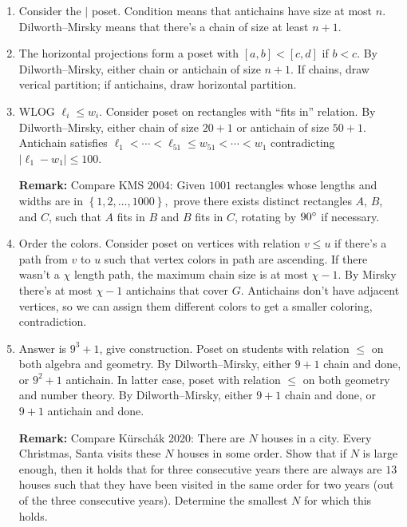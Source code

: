\documentclass[11pt,paper=letter]{scrartcl}
\begin{document}
\begin{enumerate}
\item Consider the $\mid$ poset. Condition means that antichains have size at most $n$. Dilworth--Mirsky means that there's a chain of size at least $n + 1$.

\item The horizontal projections form a poset with $[a, b] < [c, d]$ if $b < c$. By Dilworth--Mirsky, either chain or antichain of size $n + 1$. If chains, draw verical partition; if antichains, draw horizontal partition.

\item WLOG $\ell_i \le w_i$. Consider poset on rectangles with ``fits in'' relation. By Dilworth--Mirsky, either chain of size $20 + 1$ or antichain of size $50 + 1$. Antichain satisfies $\ell_1 < \cdots < \ell_{51} \le w_{51} < \cdots < w_1$ contradicting $|\ell_1 - w_1| \le 100$.

\textbf{Remark:} Compare KMS 2004: Given $1001$ rectangles whose lengths and widths are in $\left\{1, 2, \ldots, 1000\right\},$ prove there exists distinct rectangles $A$, $B$, and $C$, such that $A$ fits in $B$ and $B$ fits in $C$, rotating by $90^\circ$ if necessary.

\item Order the colors. Consider poset on vertices with relation $v \le u$ if there's a path from $v$ to $u$ such that vertex colors in path are ascending. If there wasn't a $\chi$ length path, the maximum chain size is at most $\chi - 1$. By Mirsky there's at most $\chi - 1$ antichains that cover $G$. Antichains don't have adjacent vertices, so we can assign them different colors to get a smaller coloring, contradiction.

\item Answer is $9^3 + 1$, give construction. Poset on students with relation $\le$ on both algebra and geometry. By Dilworth--Mirsky, either $9 + 1$ chain and done, or $9^2 + 1$ antichain. In latter case, poset with relation $\le$ on both geometry and number theory. By Dilworth--Mirsky, either $9 + 1$ chain and done, or $9 + 1$ antichain and done.

\textbf{Remark:} Compare K\"ursch\'ak 2020: There are $N$ houses in a city. Every Christmas, Santa visits these $N$ houses in some order. Show that if $N$ is large enough, then it holds that for three consecutive years there are always are $13$ houses such that they have been visited in the same order for two years (out of the three consecutive years). Determine the smallest $N$ for which this holds.


\end{enumerate}
\end{document}

